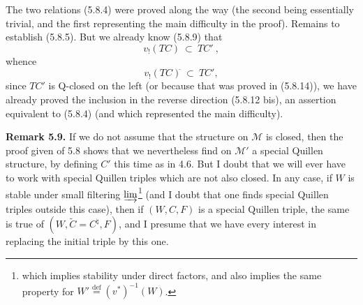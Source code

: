 \documentclass[11pt]{article}
\newcommand{\msp}[1]{\marginpar{\footnotesize [#1]}}
\newcommand{\cl}{^{\tilde{}}}%
\newcommand{\defeq}{\overset{\text{def}}{=}}
\begin{document}
The two relations (5.8.4) were proved along the way (the second being essentially trivial, and the first representing the main difficulty in the proof). Remains to establish (5.8.5). But we already know (5.8.9) that
\[
v_!(TC) \ \subset \ TC'\ ,
\]
\msp{page 97}
whence
\[
v_!(TC)\cl \ \subset \ TC',
\]
since $TC'$ is Q-closed on the left (or because that was proved in (5.8.14)), we have already proved the inclusion in the reverse direction (5.8.12 bis), an assertion equivalent to (5.8.4) (and which represented the main difficulty).

\textbf{Remark 5.9.} If we do not assume that the structure on $\mathcal{M}$ is closed, then the proof given of 5.8 shows that we nevertheless find on $\mathcal{M}'$ a special Quillen structure, by defining $C'$ this time as in 4.6. But I doubt that we will ever have to work with special Quillen triples which are not also closed. In any case, if $W$ is stable under small filtering $\varinjlim$\footnote[28]{which implies stability under direct factors, and also implies the same property for $W' \defeq (v^*)^{-1}(W)$.} (and I doubt that one finds special Quillen triples outside this case), then if $(W, C, F)$ is a special Quillen triple, the same is true of $(W, \tilde{C} = C^\natural, F)$, and I presume that we have every interest in replacing the initial triple by this one. %
\end{document}
